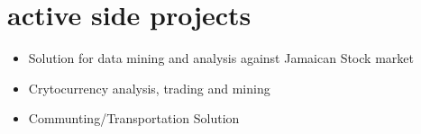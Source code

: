 \documentclass[]{friggeri-cvRS}
\begin{document}

\section{active side projects}
\begin{itemize}
	\item Solution for data mining and analysis against Jamaican Stock market 
	\item Crytocurrency analysis, trading and mining
    \item Communting/Transportation Solution 
\end{itemize}

\end{document}
